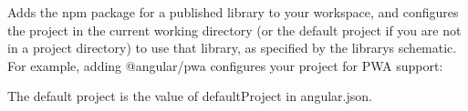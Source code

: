 Adds the npm package for a published library to your workspace, and configures the project in the current working directory (or the default project if you are not in a project directory) to use that library, as specified by the library\textquotesingle{}s schematic. For example, adding {\ttfamily @angular/pwa} configures your project for PWA support\+: 
\begin{DoxyCode}{0}

\end{DoxyCode}


The default project is the value of {\ttfamily default\+Project} in {\ttfamily angular.\+json}. 